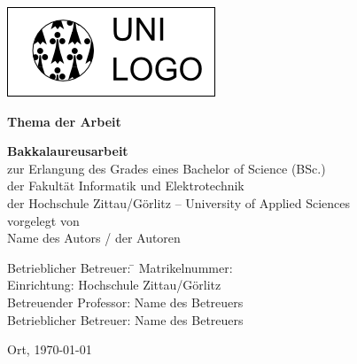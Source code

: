  \begin{titlepage}

\begin{center}
	\includegraphics[scale=0.6]{pics/Beispiellogo.png}%
\end{center}
	\vspace{2cm}
      \enlargethispage{3cm}
      \begin{center}
          {\LARGE \textbf{Thema der Arbeit}}
          \vspace{3cm}
          \begin{flushleft}
              {\large \textbf{Bakkalaureusarbeit}}\\[1cm]
              zur Erlangung des Grades eines Bachelor of Science (BSc.)\\
              der Fakult\"{a}t Informatik und Elektrotechnik \\
              der Hochschule Zittau/G\"{o}rlitz -- University of Applied Sciences\\[3cm]

          vorgelegt von \\[1cm]
          {\large Name des Autors / der Autoren} \\
	

          {    \begin{tabbing}

	    
                Betrieblicher Betreuer: \= \kill
		 Matrikelnummer:  \\
				Einrichtung: \> Hochschule Zittau/Görlitz \\
                Betreuender Professor: \> Name des Betreuers\\
                Betrieblicher Betreuer: \> Name des Betreuers\\
            \end{tabbing}}
          \vfill
              Ort, \today
          \end{flushleft}


      \end{center}
      \setcounter{page}{-1}
  \end{titlepage}